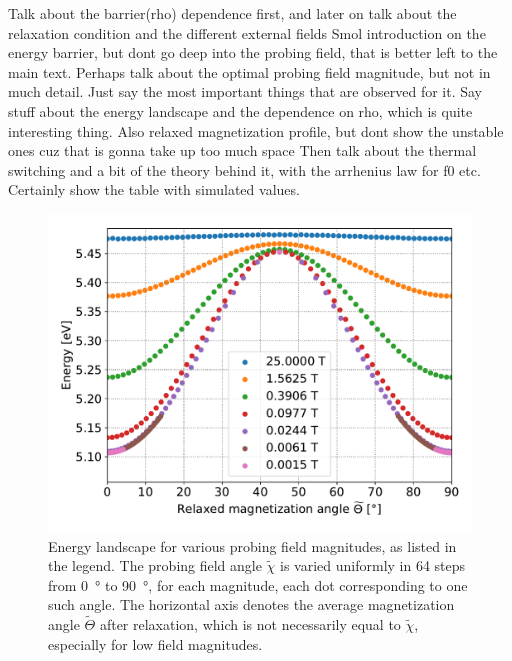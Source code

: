 \documentclass[twocolumn]{phdsymp}
\begin{document}
Talk about the barrier(rho) dependence first, and later on talk about the relaxation condition and the different external fields
Smol introduction on the energy barrier, but dont go deep into the probing field, that is better left to the main text. Perhaps talk about the optimal probing field magnitude, but not in much detail. Just say the most important things that are observed for it.
Say stuff about the energy landscape and the dependence on rho, which is quite interesting thing. Also relaxed magnetization profile, but dont show the unstable ones cuz that is gonna take up too much space
Then talk about the thermal switching and a bit of the theory behind it, with the arrhenius law for f0 etc. Certainly show the table with simulated values.
\begin{figure}
    \centering
    \includegraphics[width=0.9\columnwidth]{Figures/Plus_65_B25-0.001-div4_a128Pi_plotOptimized.pdf}
    \caption{Energy landscape for various probing field magnitudes, as listed in the legend. The probing field angle $\widetilde{\chi}$ is varied uniformly in 64 steps from \SI{0}{\degree} to \SI{90}{\degree}, for each magnitude, each dot corresponding to one such angle. The horizontal axis denotes the average magnetization angle $\widetilde{\Theta}$ after relaxation, which is not necessarily equal to $\widetilde{\chi}$, especially for low field magnitudes.}
    \label{fig:EA_EnergyLandscape}
\end{figure}
\end{document}
